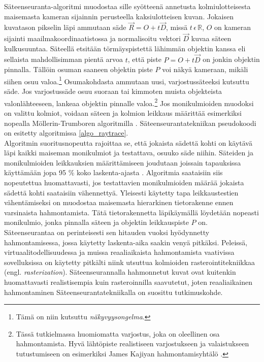 \documentclass[a4paper, 12pt, titlepage]{article}
\newcommand{\R}{\mathbb{R}}
\begin{document}
Säteenseuranta-algoritmi muodostaa sille syötteenä annetusta kolmiulotteisesta maisemasta kameran sijainnin perusteella kaksiulotteisen kuvan. Jokaisen kuvatason pikselin läpi ammutaan säde $\vec{R}=O+t\vec{D}$, missä $t\,\epsilon\,\R$, $O$ on kameran sijainti maailmakoordinaatistossa ja normalisoitu vektori $\vec{D}$ kuvaa säteen kulkusuuntaa. Säteellä etsitään törmäyspistettä lähimmän objektin kanssa eli sellaista mahdollisimman pientä arvoa $t$, että piste $P=O+t\vec{D}$ on jonkin objektin pinnalla. Tällöin osuman saaneen objektin piste $P$ voi näkyä kameraan, mikäli siihen osuu valoa.\footnote{Tämä on niin kutsuttu \emph{näkyvyysongelma}.} Osumakohdasta ammutaan uusi, varjostussäteeksi kutsuttu säde. Jos varjostussäde osuu suoraan tai kimmoten muista objekteista valonlähteeseen, lankeaa objektin pinnalle valoa.\footnote{Tässä tutkielmassa huomiomatta varjostus, joka on oleellinen osa hahmontamista. Hyvä lähtöpiste realistiseen varjostukseen ja valaistukseen tutustumiseen on esimerkiksi James Kajiyan hahmontamisyhtälö \citep[ks.][]{kajiya}.}  \citep[.]{janke} Jos monikulmioiden muodoksi on valittu kolmiot, voidaan säteen ja kolmion leikkaus määrittää esimerkiksi nopealla Möllerin-Trumboren algoritmilla \citep[ks.][]{moller}. Säteenseurantatekniikan pseudokoodi on esitetty algoritmissa \ref{algo_raytrace}.\\


Algoritmin suoritusnopeutta rajoittaa se, että jokaista sädettä kohti on käytävä läpi kaikki maiseman monikulmiot ja testattava, osuuko säde niihin. Säteiden ja monikulmioiden leikkauksien määrittämiseen joudutaan joissain tapauksissa käyttämään jopa 95 \% koko laskenta-ajasta \citep{whitted}. Algoritmia saataisiin siis nopeutettua huomattavasti, jos testattavien monikulmioiden määrää jokaista sädettä kohti saataisiin vähennettyä. Yleisesti käytetty tapa leikkaustestien vähentämiseksi on muodostaa maisemasta hierarkinen tietorakenne ennen varsinaista hahmontamista. Tätä tietorakennetta läpikäymällä löydetään nopeasti monikulmio, jonka pinnalla säteen ja objektin leikkauspiste $P$ on. \citep[.]{rubin}\\

Säteenseurantaa on perinteisesti sen hitauden vuoksi hyödynnetty hahmontamisessa, jossa käytetty laskenta-aika saakin venyä pitkäksi. Peleissä, virtuaalitodellisuudessa ja muissa reaaliaikaista hahmontamista vaativissa sovelluksissa on käytetty pitkälti niink utsuttua kolmioiden rasterointitekniikkaa (engl. \emph{rasterization}). Säteenseurannalla hahmonnetut kuvat ovat kuitenkin huomattavasti realistisempia kuin rasteroinnilla saavutetut, joten reaaliaikainen hahmontaminen Säteenseurantatekniikalla on suosittu tutkimuskohde. \citep[.]{wald04}  
 
\end{document}
